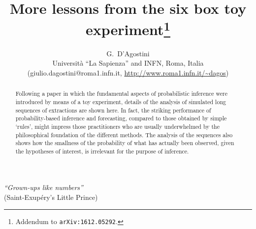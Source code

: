 \documentclass[11pt]{article}
\begin{document}
\newcommand{\bm}[1]{\mbox{\boldmath$#1$}}

\def\mvec#1{{\bm{#1}}}   %

\title{More lessons from the six box toy 
experiment\footnote{Addendum to {\tt arXiv:1612.05292}.} 
}

\author{G.~D'Agostini \\
Universit\`a ``La Sapienza'' and INFN, Roma, Italia \\
{\small (giulio.dagostini@roma1.infn.it,
 \url{http://www.roma1.infn.it/~dagos})}
}

\date{}

\maketitle

\begin{abstract}

Following a paper in which the fundamental aspects
of probabilistic inference were introduced by means of a toy
experiment, details of the analysis of simulated
long sequences of extractions are shown here.
In fact, the striking performance of probability-based
inference and forecasting, compared to those
obtained by simple `rules', 
might impress those practitioners who are usually 
underwhelmed by the philosophical foundation 
of the different methods.
The analysis of the sequences also shows how the 
smallness of the probability of what has actually been 
 observed, given the hypotheses of interest, 
is irrelevant for the purpose of inference.
\end{abstract}



\begin{flushright}
{\sl ``Grown-ups like numbers''}\\
(Saint-Exup\'ery's Little Prince)
\end{flushright}
\end{document}
